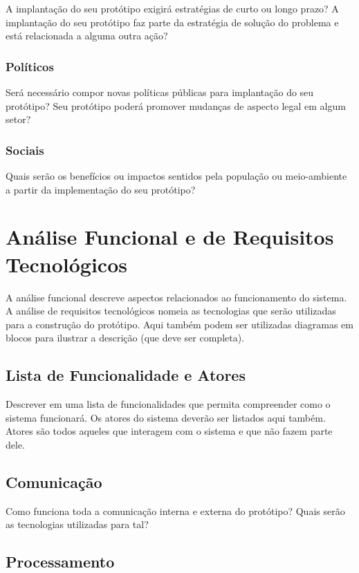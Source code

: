 A implantação do seu protótipo exigirá estratégias de curto ou longo prazo? A implantação do seu protótipo faz parte da estratégia de solução do problema e está relacionada a alguma outra ação? 

\subsubsection{Políticos}

Será necessário compor novas políticas públicas para implantação do seu protótipo? Seu protótipo poderá promover mudanças de aspecto legal em algum setor?

\subsubsection{Sociais}
Quais serão os benefícios ou impactos sentidos pela população ou meio-ambiente a partir da implementação do seu protótipo?

\section{Análise Funcional e de Requisitos Tecnológicos}
\label{sec:analisefuncional}

A análise funcional descreve aspectos relacionados ao funcionamento do sistema. A análise de requisitos tecnológicos nomeia as tecnologias que serão utilizadas para a construção do protótipo. Aqui também podem ser utilizadas diagramas em blocos para ilustrar a descrição (que deve ser completa).

\subsection{Lista de Funcionalidade e Atores}

Descrever em uma lista de funcionalidades que permita compreender como o sistema funcionará. Os atores do sistema deverão ser listados aqui também. Atores são todos aqueles que interagem com o sistema e que não fazem parte dele.

\subsection{Comunicação}
Como funciona toda a comunicação interna e externa do protótipo? Quais serão as tecnologias utilizadas para tal?

\subsection{Processamento}

